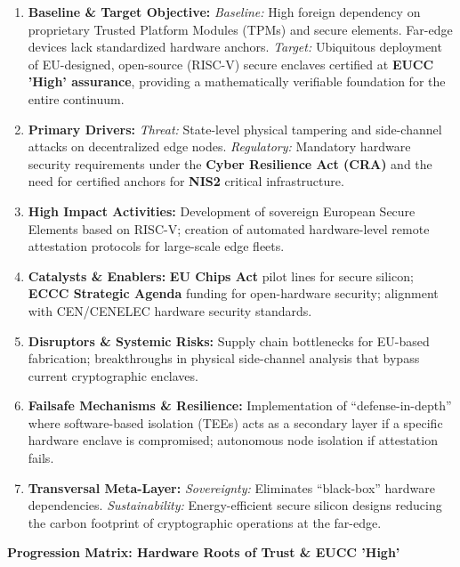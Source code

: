 \documentclass[12pt,a4paper]{article}
\begin{document}
\begin{enumerate}
\item \textbf{Baseline \& Target Objective:}
\textit{Baseline:} High foreign dependency on proprietary Trusted Platform Modules (TPMs) and secure elements. Far-edge devices lack standardized hardware anchors.
\textit{Target:} Ubiquitous deployment of EU-designed, open-source (RISC-V) secure enclaves certified at \textbf{EUCC 'High' assurance}, providing a mathematically verifiable foundation for the entire continuum.

\item \textbf{Primary Drivers:} 
\textit{Threat:} State-level physical tampering and side-channel attacks on decentralized edge nodes. 
\textit{Regulatory:} Mandatory hardware security requirements under the \textbf{Cyber Resilience Act (CRA)} and the need for certified anchors for \textbf{NIS2} critical infrastructure.

\item \textbf{High Impact Activities:} 
Development of sovereign European Secure Elements based on RISC-V; creation of automated hardware-level remote attestation protocols for large-scale edge fleets.

\item \textbf{Catalysts \& Enablers:} 
\textbf{EU Chips Act} pilot lines for secure silicon; \textbf{ECCC Strategic Agenda} funding for open-hardware security; alignment with CEN/CENELEC hardware security standards.

\item \textbf{Disruptors \& Systemic Risks:} 
Supply chain bottlenecks for EU-based fabrication; breakthroughs in physical side-channel analysis that bypass current cryptographic enclaves.

\item \textbf{Failsafe Mechanisms \& Resilience:} 
Implementation of ``defense-in-depth'' where software-based isolation (TEEs) acts as a secondary layer if a specific hardware enclave is compromised; autonomous node isolation if attestation fails.

\item \textbf{Transversal Meta-Layer:} 
\textit{Sovereignty:} Eliminates ``black-box'' hardware dependencies. \textit{Sustainability:} Energy-efficient secure silicon designs reducing the carbon footprint of cryptographic operations at the far-edge.

\end{enumerate}

\vspace{0.5cm}
\noindent\textbf{Progression Matrix: Hardware Roots of Trust \& EUCC 'High'}
\vspace{0.2cm}
\end{document}
